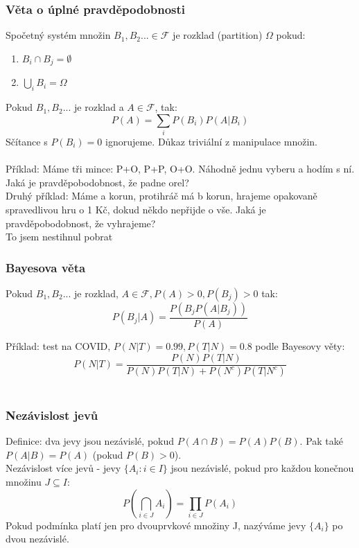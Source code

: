 \documentclass{article}
\begin{document}
\subsubsection*{Věta o úplné pravděpodobnosti}

Spočetný systém množin $B_{1},B_{2}... \in \mathcal{F}$ je rozklad (partition) $\Omega$ pokud:
\begin{enumerate}
    \item $B_{i} \cap B_{j} = \emptyset$
    \item $\bigcup_{i} B_{i} = \Omega$
\end{enumerate}
Pokud $B_{1},B_{2}... $ je rozklad a $A \in \mathcal{F}$, tak:
$$P(A) = \sum_{i}P(B_{i})P(A|B_{i})$$
Sčítance s $P(B_{i}) = 0$ ignorujeme. Důkaz triviální z manipulace množin.\\\\

Příklad: Máme tři mince: P+O, P+P, O+O. Náhodně jednu vyberu a hodím s ní. Jaká je pravděpobodobnost, že padne orel?\\
Druhý příklad: Máme a korun, protihráč má b korun, hrajeme opakovaně spravedlivou hru o 1 Kč, dokud někdo nepřijde o vše.
Jaká je pravděpobodobnost, že vyhrajeme?\\
To jsem nestihnul pobrat\\ %

\subsubsection*{Bayesova věta}
Pokud $B_{1},B_{2}... $ je rozklad, $A \in \mathcal{F}, P(A) > 0, P(B_{j}) > 0$ tak:\\
$$P(B_{j}| A) = \frac{P(B_{j}P(A|B_{j}))}{P(A)}$$

Příklad: test na COVID, $P(N|T) = 0.99, P(T|N) = 0.8$ podle Bayesovy věty:\\
$$P(N|T) = \frac{P(N)P(T|N)}{P(N)P(T|N) + P(N^{c})P(T|N^{c})}$$\\

\subsubsection*{Nezávislost jevů}
Definice: dva jevy jsou nezávislé, pokud $P(A \cap B) = P(A)P(B)$. Pak také $P(A|B)=P(A)$ (pokud $P(B) > 0$).\\
Nezávislost více jevů - jevy $\{A_{i} : i \in I\}$ jsou nezávislé, pokud pro každou konečnou množinu $J \subseteq I$:
$$P(\bigcap_{i \in J} A_{i}) = \prod_{i \in J}P(A_{i})$$
Pokud podmínka platí jen pro dvouprvkové množiny J, nazýváme jevy $\{A_{i}\}$ po dvou nezávislé.\\\\
\end{document}
